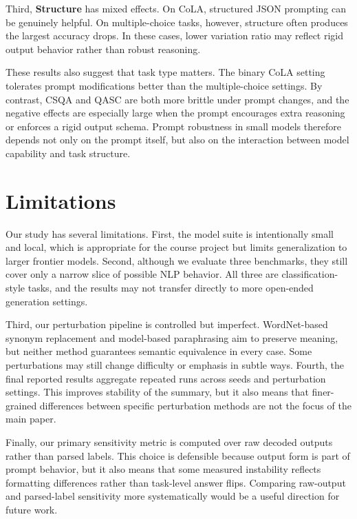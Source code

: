 \documentclass[11pt]{article}
\begin{document}
Third, \textbf{Structure} has mixed effects. On CoLA, structured JSON prompting can be genuinely helpful. On multiple-choice tasks, however, structure often produces the largest accuracy drops. In these cases, lower variation ratio may reflect rigid output behavior rather than robust reasoning.

These results also suggest that task type matters. The binary CoLA setting tolerates prompt modifications better than the multiple-choice settings. By contrast, CSQA and QASC are both more brittle under prompt changes, and the negative effects are especially large when the prompt encourages extra reasoning or enforces a rigid output schema. Prompt robustness in small models therefore depends not only on the prompt itself, but also on the interaction between model capability and task structure.

\section{Limitations}

Our study has several limitations. First, the model suite is intentionally small and local, which is appropriate for the course project but limits generalization to larger frontier models. Second, although we evaluate three benchmarks, they still cover only a narrow slice of possible NLP behavior. All three are classification-style tasks, and the results may not transfer directly to more open-ended generation settings.

Third, our perturbation pipeline is controlled but imperfect. WordNet-based synonym replacement and model-based paraphrasing aim to preserve meaning, but neither method guarantees semantic equivalence in every case. Some perturbations may still change difficulty or emphasis in subtle ways. Fourth, the final reported results aggregate repeated runs across seeds and perturbation settings. This improves stability of the summary, but it also means that finer-grained differences between specific perturbation methods are not the focus of the main paper.

Finally, our primary sensitivity metric is computed over raw decoded outputs rather than parsed labels. This choice is defensible because output form is part of prompt behavior, but it also means that some measured instability reflects formatting differences rather than task-level answer flips. Comparing raw-output and parsed-label sensitivity more systematically would be a useful direction for future work.
\end{document}
